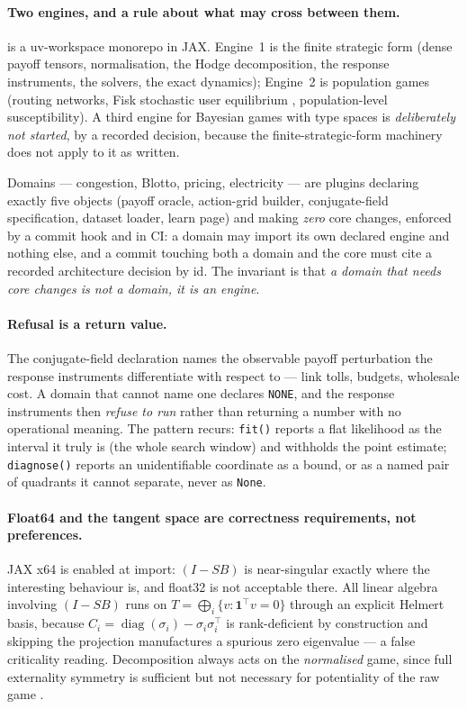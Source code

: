 \paragraph{Two engines, and a rule about what may cross between them.}
\strataq{} is a uv-workspace monorepo in JAX. Engine~1 is the finite strategic
form (dense payoff tensors, normalisation, the Hodge decomposition, the response
instruments, the solvers, the exact dynamics); Engine~2 is population games
(routing networks, Fisk stochastic user equilibrium \citep{fisk1980},
population-level susceptibility). A third engine for Bayesian games with type
spaces is \emph{deliberately not started}, by a recorded decision, because the
finite-strategic-form machinery does not apply to it as written.

Domains --- congestion, Blotto, pricing, electricity --- are plugins declaring
exactly five objects (payoff oracle, action-grid builder, conjugate-field
specification, dataset loader, learn page) and making \emph{zero} core changes,
enforced by a commit hook and in CI: a domain may import its own declared engine
and nothing else, and a commit touching both a domain and the core must cite a
recorded architecture decision by id. The invariant is that \emph{a domain that
needs core changes is not a domain, it is an engine}.

\paragraph{Refusal is a return value.} The conjugate-field declaration names the
observable payoff perturbation the response instruments differentiate with
respect to --- link tolls, budgets, wholesale cost. A domain that cannot name one
declares \texttt{NONE}, and the response instruments then \emph{refuse to run}
rather than returning a number with no operational meaning. The pattern recurs:
\texttt{fit()} reports a flat likelihood as the interval it truly is (the whole
search window) and withholds the point estimate; \texttt{diagnose()} reports an
unidentifiable coordinate as a bound, or as a named pair of quadrants it cannot
separate, never as \texttt{None}.

\paragraph{Float64 and the tangent space are correctness requirements, not
preferences.} JAX x64 is enabled at import: $(I-SB)$ is near-singular exactly
where the interesting behaviour is, and float32 is not acceptable there. All
linear algebra involving $(I-SB)$ runs on
$T=\bigoplus_i\{v:\mathbf{1}^\top v=0\}$ through an explicit Helmert basis,
because $C_i=\operatorname{diag}(\sigma_i)-\sigma_i\sigma_i^\top$ is
rank-deficient by construction and skipping the projection manufactures a
spurious zero eigenvalue --- a false criticality reading. Decomposition always
acts on the \emph{normalised} game, since full externality symmetry is
sufficient but not necessary for potentiality of the raw game
\citep{legacci2024}.

